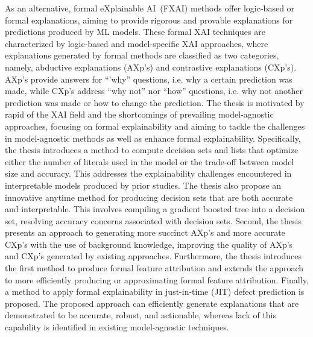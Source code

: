 As an alternative, formal eXplainable AI~(FXAI) methods offer logic-based or formal explanations,
aiming to provide rigorous and provable explanations for predictions produced by ML models.
%
These formal XAI techniques are characterized by logic-based and model-specific XAI approaches,
where explanations generated by formal methods are classified as two categories, namely, abductive explanations (AXp's) and
contrastive explanations (CXp's).
%
AXp's provide answers for ``'why'' questions, i.e. why a certain prediction was made, 
while CXp's address ``why not'' nor ``how'' questions,
i.e. why not another prediction was made or
how to change the prediction.
%
The thesis is motivated by rapid  of the XAI field and the shortcomings 
of prevailing model-agnostic approaches, focusing on formal explainability
and aiming to tackle the challenges in model-agnostic methods as well
as enhance formal explainability.
%
Specifically, the thesis introduces a method to compute decision sets and lists that optimize either 
the number of literals used in the model or the trade-off between model size and accuracy.
%
This addresses the explainability challenges encountered in interpretable models 
produced by prior studies.
%
The thesis also propose an innovative anytime method for producing decision sets
that are both accurate and interpretable.
%
This involves compiling a gradient boosted tree into a decision set, 
resolving accuracy concerns associated with decision sets.
%
Second, the thesis presents an approach to generating more succinct AXp's and more accurate CXp's 
with the use of background knowledge, improving the quality of AXp's and CXp's generated by
existing approaches.
%
Furthermore, the thesis introduces the first method to produce formal feature attribution 
and extends the approach to more efficiently producing or approximating formal feature
attribution.
%
Finally, a method to apply formal explainability in just-in-time (JIT) defect prediction is proposed.
%
The proposed approach can efficiently generate explanations that are demonstrated
to be accurate, robust, and actionable, whereas lack of this capability is 
identified in existing model-agnostic techniques.






% 

